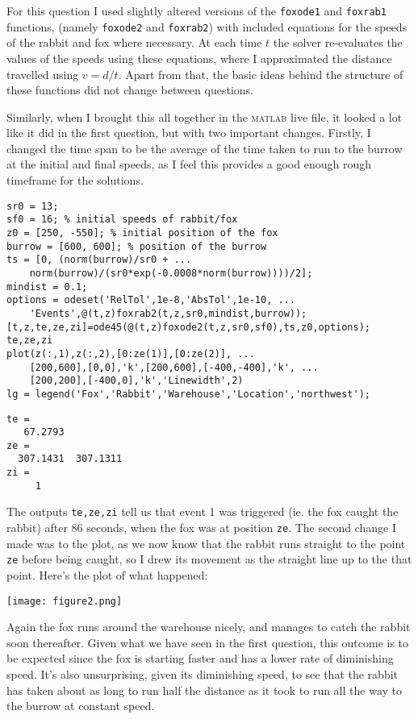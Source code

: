 \documentclass[a4paper,12pt]{article}
\begin{document}
For this question I used slightly altered versions of the \verb!foxode1! and \verb!foxrab1! functions, (namely \verb!foxode2! and \verb!foxrab2!) with included equations for the speeds of the rabbit and fox where necessary. At each time $t$ the solver re-evaluates the values of the speeds using these equations, where I approximated the distance travelled using $v=d/t$. Apart from that, the basic ideas behind the structure of these functions did not change between questions.


\newpage


Similarly, when I brought this all together in the \textsc{matlab} live file, it looked a lot like it did in the first question, but with two important changes. Firstly, I changed the time span to be the average of the time taken to run to the burrow at the initial and final speeds, as I feel this provides a good enough rough timeframe for the solutions.

\begin{lstlisting}
sr0 = 13;
sf0 = 16; % initial speeds of rabbit/fox
z0 = [250, -550]; % initial position of the fox
burrow = [600, 600]; % position of the burrow
ts = [0, (norm(burrow)/sr0 + ...
    norm(burrow)/(sr0*exp(-0.0008*norm(burrow))))/2];
mindist = 0.1;
options = odeset('RelTol',1e-8,'AbsTol',1e-10, ...
    'Events',@(t,z)foxrab2(t,z,sr0,mindist,burrow));
[t,z,te,ze,zi]=ode45(@(t,z)foxode2(t,z,sr0,sf0),ts,z0,options);
te,ze,zi
plot(z(:,1),z(:,2),[0:ze(1)],[0:ze(2)], ...
    [200,600],[0,0],'k',[200,600],[-400,-400],'k', ...
    [200,200],[-400,0],'k','Linewidth',2)
lg = legend('Fox','Rabbit','Warehouse','Location','northwest');
\end{lstlisting}
\begin{lstlisting}
te =
   67.2793
ze =
  307.1431  307.1311
zi =
     1
\end{lstlisting}

The outputs \verb!te,ze,zi! tell us that event 1 was triggered (ie. the fox caught the rabbit) after 86 seconds, when the fox was at position \verb!ze!. The second change I made was to the plot, as we now know that the rabbit runs straight to the point \verb!ze! before being caught, so I drew its movement as the straight line up to the that point. Here's the plot of what happened:

\texttt{[image: figure2.png]}

Again the fox runs around the warehouse nicely, and manages to catch the rabbit soon thereafter. Given what we have seen in the first question, this outcome is to be expected since the fox is starting faster and has a lower rate of diminishing speed. It's also unsurprising, given its diminishing speed, to see that the rabbit has taken about as long to run half the distance as it took to run all the way to the burrow at constant speed.
\end{document}
